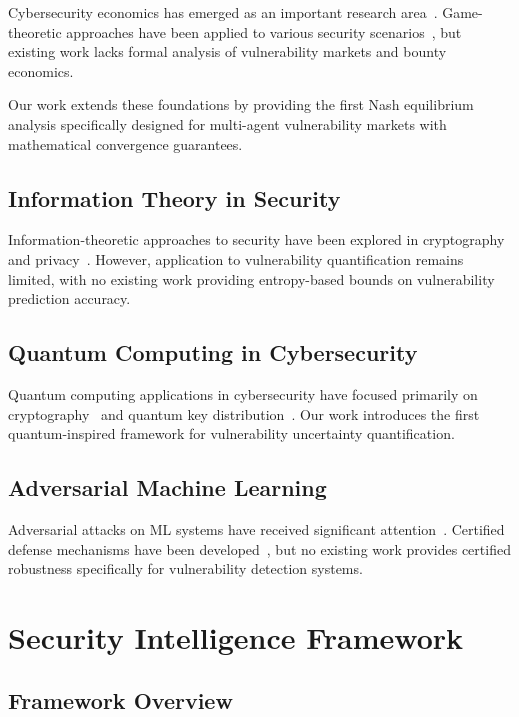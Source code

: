 \documentclass[journal]{IEEEtran}
\begin{document}
Cybersecurity economics has emerged as an important research area~\cite{anderson2001, gordon2002}. Game-theoretic approaches have been applied to various security scenarios~\cite{lye2005, alpcan2006}, but existing work lacks formal analysis of vulnerability markets and bounty economics.

Our work extends these foundations by providing the first Nash equilibrium analysis specifically designed for multi-agent vulnerability markets with mathematical convergence guarantees.

\subsection{Information Theory in Security}

Information-theoretic approaches to security have been explored in cryptography~\cite{shannon1949} and privacy~\cite{dwork2006}. However, application to vulnerability quantification remains limited, with no existing work providing entropy-based bounds on vulnerability prediction accuracy.

\subsection{Quantum Computing in Cybersecurity}

Quantum computing applications in cybersecurity have focused primarily on cryptography~\cite{shor1994} and quantum key distribution~\cite{bennett1984}. Our work introduces the first quantum-inspired framework for vulnerability uncertainty quantification.

\subsection{Adversarial Machine Learning}

Adversarial attacks on ML systems have received significant attention~\cite{szegedy2013, goodfellow2014}. Certified defense mechanisms have been developed~\cite{cohen2019, lecuyer2019}, but no existing work provides certified robustness specifically for vulnerability detection systems.

\section{Security Intelligence Framework}\label{sec:framework}

\subsection{Framework Overview}
\end{document}
